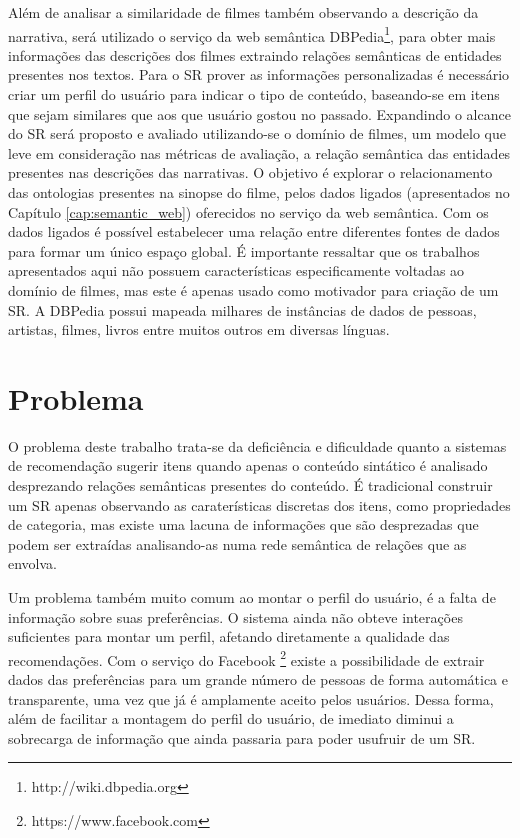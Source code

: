 Além de analisar a similaridade de filmes também observando a descrição da narrativa, será utilizado o serviço da web semântica DBPedia\footnote{http://wiki.dbpedia.org}, para obter mais informações das descrições dos filmes extraindo relações semânticas de entidades presentes nos textos. Para o SR prover as informações personalizadas é necessário criar um perfil do usuário para indicar o tipo de conteúdo, baseando-se em itens que sejam similares que aos que usuário gostou no passado. Expandindo o alcance do SR será proposto e avaliado utilizando-se o domínio de filmes, um modelo que leve em consideração nas métricas de avaliação, a relação semântica das entidades presentes nas descrições das narrativas. O objetivo é explorar o relacionamento das ontologias presentes na sinopse do filme, pelos dados ligados (apresentados no Capítulo \ref{cap:semantic_web}) oferecidos no serviço da web semântica. Com os dados ligados é possível estabelecer uma relação entre diferentes fontes de dados para formar um único espaço global. É importante ressaltar que os trabalhos apresentados aqui não possuem características especificamente voltadas ao domínio de filmes, mas este é apenas usado como motivador para criação de um SR. A DBPedia possui mapeada milhares de instâncias de dados de pessoas, artistas, filmes, livros entre muitos outros em diversas línguas.

\section{Problema}
O problema deste trabalho trata-se da deficiência e dificuldade quanto a sistemas de recomendação sugerir itens quando apenas o conteúdo sintático é analisado desprezando relações semânticas presentes do conteúdo. É tradicional construir um SR apenas observando as caraterísticas discretas dos itens, como propriedades de categoria, mas existe uma lacuna de informações que são desprezadas que podem ser extraídas analisando-as numa rede semântica de relações que as envolva.

Um problema também muito comum ao montar o perfil do usuário, é a falta de informação sobre suas preferências. O sistema ainda não obteve interações suficientes para montar um perfil, afetando diretamente a qualidade das recomendações. Com o serviço do Facebook \footnote{https://www.facebook.com} existe a possibilidade de extrair dados das preferências para um grande número de pessoas de forma automática e transparente, uma vez que já é amplamente aceito pelos usuários. Dessa forma, além de facilitar a montagem do perfil do usuário, de imediato diminui a sobrecarga de informação que ainda passaria para poder usufruir de um SR.

